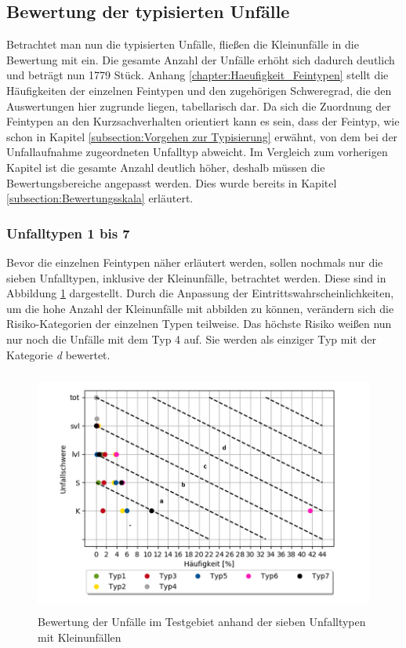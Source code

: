 \subsection{Bewertung der typisierten Unfälle}\label{subsection:Bewertung der typisierten Unfälle}
Betrachtet man nun die typisierten Unfälle, fließen die Kleinunfälle in die Bewertung mit ein. Die gesamte Anzahl der Unfälle erhöht sich dadurch deutlich und beträgt nun 1779 Stück. Anhang \ref{chapter:Haeufigkeit_Feintypen} stellt die Häufigkeiten der einzelnen Feintypen und den zugehörigen Schweregrad, die den Auswertungen hier zugrunde liegen, tabellarisch dar. Da sich die Zuordnung der Feintypen an den Kurzsachverhalten orientiert kann es sein, dass der Feintyp, wie schon in Kapitel \ref{subsection:Vorgehen zur Typisierung} erwähnt, von dem bei der Unfallaufnahme zugeordneten Unfalltyp abweicht. Im Vergleich zum vorherigen Kapitel ist die gesamte Anzahl deutlich höher, deshalb müssen die Bewertungsbereiche angepasst werden. Dies wurde bereits in Kapitel \ref{subsection:Bewertungsskala} erläutert.

\subsubsection{Unfalltypen 1 bis 7}
Bevor die einzelnen Feintypen näher erläutert werden, sollen nochmals nur die sieben Unfalltypen, inklusive der Kleinunfälle, betrachtet werden. Diese sind in Abbildung \ref{fig:Bewertung_UTF} dargestellt. Durch die Anpassung der Eintrittswahrscheinlichkeiten, um die hohe Anzahl der Kleinunfälle mit abbilden zu können, verändern sich die Risiko-Kategorien der einzelnen Typen teilweise. Das höchste Risiko weißen nun nur noch die Unfälle mit dem Typ 4 auf. Sie werden als einziger Typ mit der Kategorie \textit{d} bewertet.

\begin{savenotes}
	\begin{figure}[H]
		\centering
		\includegraphics[width=12cm,height=8cm]{figures/Bewertung_UTF}
		\caption[Bewertung der Unfälle im Testgebiet anhand der sieben Unfalltypen mit Kleinunfällen]{Bewertung der Unfälle im Testgebiet anhand der sieben Unfalltypen mit Kleinunfällen}\label{fig:Bewertung_UTF}
	\end{figure}
\end{savenotes}


